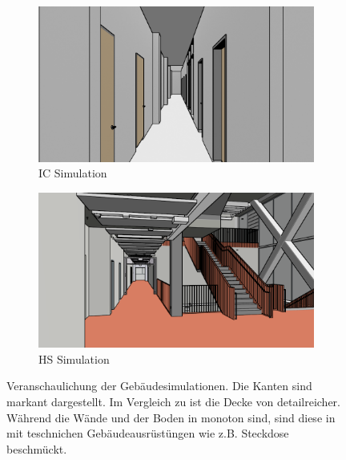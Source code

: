 \begin{figure}[H]
	\centering
	\begin{subfigure}[t]{0.48\linewidth}
		\centering
		\includegraphics[width=\linewidth]{images/syn_dataset/ic00343.png}
		\caption{IC Simulation}
		\label{subfig:ic_syn_example}
	\end{subfigure}
	\hfill
	\begin{subfigure}[t]{0.48\linewidth}
		\centering
		\includegraphics[width=\linewidth]{images/syn_dataset/hs_gamma02162.png}
		\caption{HS Simulation}
		\label{subfig:hs_gamma_syn_example}
	\end{subfigure}
	\caption{Veranschaulichung der Gebäudesimulationen. Die Kanten sind markant dargestellt. Im Vergleich zu  ist die Decke von  detailreicher. Während die Wände und der Boden in  monoton sind, sind diese in  mit teschnichen Gebäudeausrüstüngen wie z.B. Steckdose beschmückt.}
	\label{fig:difference_3d}
\end{figure}

